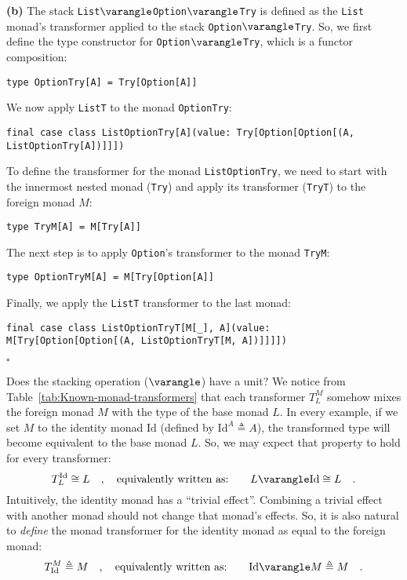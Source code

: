 \textbf{(b)} The stack \lstinline!List!$\varangle$\lstinline!Option!$\varangle$\lstinline!Try!
is defined as the \lstinline!List! monad\textsf{'}s transformer applied to
the stack \lstinline!Option!$\varangle$\lstinline!Try!. So, we
first define the type constructor for \lstinline!Option!$\varangle$\lstinline!Try!,
which is a functor composition:
\begin{lstlisting}
type OptionTry[A] = Try[Option[A]]
\end{lstlisting}
We now apply \lstinline!ListT! to the monad \lstinline!OptionTry!:
\begin{lstlisting}
final case class ListOptionTry[A](value: Try[Option[Option[(A, ListOptionTry[A])]]])
\end{lstlisting}

To define the transformer for the monad \lstinline!ListOptionTry!,
we need to start with the innermost nested monad (\lstinline!Try!)
and apply its transformer (\lstinline!TryT!) to the foreign monad
$M$:
\begin{lstlisting}
type TryM[A] = M[Try[A]]
\end{lstlisting}
The next step is to apply \lstinline!Option!\textsf{'}s transformer to the
monad \lstinline!TryM!:
\begin{lstlisting}
type OptionTryM[A] = M[Try[Option[A]]
\end{lstlisting}
Finally, we apply the \lstinline!ListT! transformer to the last monad:
\begin{lstlisting}
final case class ListOptionTryT[M[_], A](value: M[Try[Option[Option[(A, ListOptionTryT[M, A])]]]])
\end{lstlisting}
$\square$

Does the stacking operation ($\varangle$) have a unit? We notice
from Table~\ref{tab:Known-monad-transformers} that each transformer
$T_{L}^{M}$ somehow mixes the foreign monad $M$ with the type of
the base monad $L$. In every example, if we set $M$ to the identity
monad $\text{Id}$ (defined by $\text{Id}^{A}\triangleq A$), the
transformed type will become equivalent to the base monad $L$. So,
we may expect that property to hold for every transformer:
\[
T_{L}^{\text{Id}}\cong L\quad,\quad\text{equivalently written as:}\quad\quad L\varangle\text{Id}\cong L\quad.
\]
Intuitively, the identity monad has a \textsf{``}trivial effect\textsf{''}. Combining
a trivial effect with another monad should not change that monad\textsf{'}s
effects. So, it is also natural to \emph{define} the monad transformer
for the identity monad as equal to the foreign monad:
\[
T_{\text{Id}}^{M}\triangleq M\quad,\quad\text{equivalently written as:}\quad\quad\text{Id}\varangle M\triangleq M\quad.
\]

